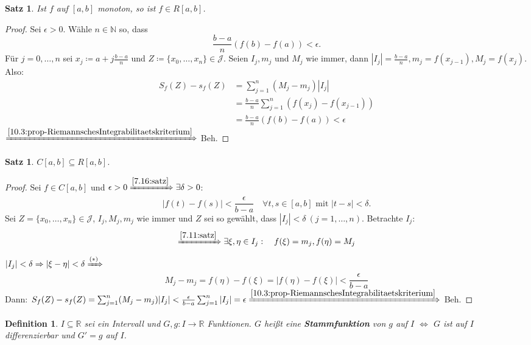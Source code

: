 \documentclass[14pt,titlepage,ngerman,a4paper,headsepline,DIV15,halfparskip*]{scrartcl}
\newcommand{\N}{\mathbb{N}}
\newcommand{\R}{\mathbb{R}}
\theoremstyle{named}
\theoremstyle{dotless}
\newtheorem{satz}[namedtheorem]{Satz}
\newtheorem*{definition}{Definition}
\begin{document}
\begin{satz} \label{10.4:satz}
	Ist $f$ auf $[a, b]$ monoton, so ist $f \in R[a, b]$.
\end{satz}

\begin{proof}
	Sei $\epsilon > 0$. Wähle $n \in \N$ so, dass 
	$$ \frac{b - a}{n} (f(b) - f(a)) < \epsilon. $$
	Für $j = 0, \dotsc, n$ sei $x_{j} \coloneqq a + j \frac{b - a}{n}$ und $Z \coloneqq \{ x_{0}, \dotsc, x_{n} \} \in \mathcal{J}$. Seien $I_{j}, m_{j}$ und $M_{j}$ wie immer, dann $|I_{j}| = \frac{b - a}{n}, m_{j} = f(x_{j-1}), M_{j} = f(x_{j})$. Also: \\ %
	\begin{align*}
		S_{f}(Z) - s_{f}(Z) & = \sum_{j=1}^{n} (M_{j} - m_{j})|I_{j}| \\
		& = \frac{b - a}{n} \sum_{j=1}^{n} ( f(x_{j}) - f(x_{j-1}) ) \\
		& = \frac{b - a}{n} ( f(b) - f(a) ) < \epsilon
	\end{align*} 
	$\xRightarrow[]{\ref{10.3:prop-RiemannschesIntegrabilitaetskriterium}}$ Beh.
\end{proof}


\begin{satz} \label{10.5:satz}
	$C[a, b] \subseteq R[a, b]$.
\end{satz}

\begin{proof}
	Sei $f \in C[a, b]$ und $\epsilon > 0 \xRightarrow[]{\ref{7.16:satz}} \exists \delta > 0$:
	\[ |f(t) - f(s)| < \frac{\epsilon}{b - a} \quad \forall t, s \in [a, b] \text{ mit } |t - s| < \delta. \tag*{$(*)$} \]
	Sei $Z = \{ x_{0}, \dotsc, x_{n} \} \in \mathcal{J}$, $I_{j}, M_{j}, m_{j}$ wie immer und $Z$ sei so gewählt, dass $|I_{j}| < \delta ~(j = 1, \dotsc, n)$. Betrachte $I_{j}$: %
	$$ \xRightarrow[]{\ref{7.11:satz}} \exists \xi, \eta \in I_{j}: \quad f(\xi) = m_{j}, f(\eta) = M_{j} $$
	$|I_{j}| < \delta \Rightarrow |\xi - \eta| < \delta \xRightarrow[]{(*)}$
	$$ M_{j} - m_{j} = f(\eta) - f(\xi) = |f(\eta) - f(\xi)| < \frac{\epsilon}{b - a} $$
	Dann: $S_{f}(Z) - s_{f}(Z) = \sum_{j=1}^{n} (M_{j} - m_{j}) |I_{j}| < \frac{\epsilon}{b - a} \sum_{j=1}^{n} |I_{j}| = \epsilon \xRightarrow[]{\ref{10.3:prop-RiemannschesIntegrabilitaetskriterium}}$ Beh.
\end{proof}

\begin{definition}
	$I \subseteq \R$ sei ein Intervall und $G, g \colon I \rightarrow \R$ Funktionen. $G$ hei{\ss}t eine \textbf{Stammfunktion} von $g$ auf $I$ $\iff$ $G$ ist auf $I$ differenzierbar und $G' = g$ auf $I$.
\end{definition}
\end{document}
